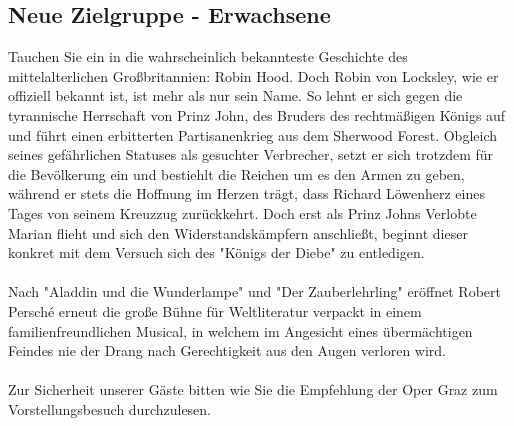 \documentclass{article}
\begin{document}
\subsection*{Neue Zielgruppe - Erwachsene}
Tauchen Sie ein in die wahrscheinlich bekannteste Geschichte des mittelalterlichen Großbritannien: Robin Hood. Doch Robin von Locksley, wie er offiziell bekannt ist, ist mehr als nur sein Name. So lehnt er sich gegen die tyrannische Herrschaft von Prinz John, des Bruders des rechtmäßigen Königs auf und führt einen erbitterten Partisanenkrieg aus dem Sherwood Forest. Obgleich seines gefährlichen Statuses als gesuchter Verbrecher, setzt er sich trotzdem für die Bevölkerung ein und bestiehlt die Reichen um es den Armen zu geben, während er stets die Hoffnung im Herzen trägt, dass Richard Löwenherz eines Tages von seinem Kreuzzug zurückkehrt. Doch erst als Prinz Johns Verlobte Marian flieht und sich den Widerstandskämpfern anschließt, beginnt dieser konkret mit dem Versuch sich des "Königs der Diebe" zu entledigen. \\ \\
Nach "Aladdin und die Wunderlampe" und "Der Zauberlehrling" eröffnet Robert Persché erneut die große Bühne für Weltliteratur verpackt in einem familienfreundlichen Musical, in welchem im Angesicht eines übermächtigen Feindes nie der Drang nach Gerechtigkeit aus den Augen verloren wird. \\ \\
Zur Sicherheit unserer Gäste bitten wie Sie die Empfehlung der Oper Graz zum Vorstellungsbesuch durchzulesen. \\
	
\end{document}
